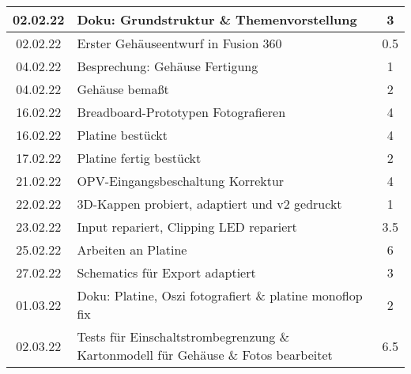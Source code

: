 \begin{longtable}{c|p{10cm}|c}
    02.02.22       & Doku: Grundstruktur \& Themenvorstellung                                                               & 3                     \\ \hline
    02.02.22       & Erster Gehäuseentwurf in Fusion 360                                                                    & 0.5                   \\ \hline
    04.02.22       & Besprechung: Gehäuse Fertigung                                                                         & 1                     \\ \hline
    04.02.22       & Gehäuse bemaßt                                                                                         & 2                     \\ \hline
    16.02.22       & Breadboard-Prototypen Fotografieren                                                                    & 4                     \\ \hline
    16.02.22       & Platine bestückt                                                                                       & 4                     \\ \hline
    17.02.22       & Platine fertig bestückt                                                                                & 2                     \\ \hline
    21.02.22       & OPV-Eingangsbeschaltung Korrektur                                                                      & 4                     \\ \hline
    22.02.22       & 3D-Kappen probiert, adaptiert und v2 gedruckt                                                          & 1                     \\ \hline
    23.02.22       & Input repariert, Clipping LED repariert                                                                & 3.5                   \\ \hline
    25.02.22       & Arbeiten an Platine                                                                                    & 6                     \\ \hline
    27.02.22       & Schematics für Export adaptiert                                                                        & 3                     \\ \hline
    01.03.22       & Doku: Platine, Oszi fotografiert \& platine monoflop fix                                               & 2                     \\ \hline
    02.03.22       & Tests für Einschaltstrombegrenzung \& Kartonmodell \newline für Gehäuse \& Fotos bearbeitet                   & 6.5                   \\ \hline

\end{longtable}
